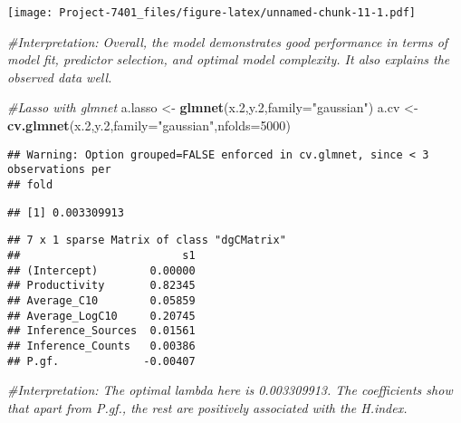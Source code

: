 \documentclass[
]{article}
\newenvironment{Shaded}{\begin{snugshade}}{\end{snugshade}}
\newcommand{\AttributeTok}[1]{\textcolor[rgb]{0.13,0.29,0.53}{#1}}
\newcommand{\CommentTok}[1]{\textcolor[rgb]{0.56,0.35,0.01}{\textit{#1}}}
\newcommand{\DecValTok}[1]{\textcolor[rgb]{0.00,0.00,0.81}{#1}}
\newcommand{\FloatTok}[1]{\textcolor[rgb]{0.00,0.00,0.81}{#1}}
\newcommand{\FunctionTok}[1]{\textcolor[rgb]{0.13,0.29,0.53}{\textbf{#1}}}
\newcommand{\NormalTok}[1]{#1}
\newcommand{\OtherTok}[1]{\textcolor[rgb]{0.56,0.35,0.01}{#1}}
\newcommand{\SpecialCharTok}[1]{\textcolor[rgb]{0.81,0.36,0.00}{\textbf{#1}}}
\newcommand{\StringTok}[1]{\textcolor[rgb]{0.31,0.60,0.02}{#1}}
\begin{document}
\texttt{[image: Project-7401\_files/figure-latex/unnamed-chunk-11-1.pdf]}

\begin{Shaded}
\begin{Highlighting}[]
\CommentTok{\#Interpretation: Overall, the model demonstrates good performance in terms of model fit, predictor selection, and optimal model complexity. It also explains the observed data well.}

\CommentTok{\#Lasso with glmnet}
\NormalTok{a.lasso }\OtherTok{\textless{}{-}} \FunctionTok{glmnet}\NormalTok{(x}\FloatTok{.2}\NormalTok{,y}\FloatTok{.2}\NormalTok{,}\AttributeTok{family=}\StringTok{"gaussian"}\NormalTok{)}
\NormalTok{a.cv }\OtherTok{\textless{}{-}} \FunctionTok{cv.glmnet}\NormalTok{(x}\FloatTok{.2}\NormalTok{,y}\FloatTok{.2}\NormalTok{,}\AttributeTok{family=}\StringTok{"gaussian"}\NormalTok{,}\AttributeTok{nfolds=}\DecValTok{5000}\NormalTok{)}
\end{Highlighting}
\end{Shaded}

\begin{verbatim}
## Warning: Option grouped=FALSE enforced in cv.glmnet, since < 3 observations per
## fold
\end{verbatim}

\begin{Shaded}
\end{Shaded}

\begin{verbatim}
## [1] 0.003309913
\end{verbatim}

\begin{Shaded}
\end{Shaded}

\begin{verbatim}
## 7 x 1 sparse Matrix of class "dgCMatrix"
##                         s1
## (Intercept)        0.00000
## Productivity       0.82345
## Average_C10        0.05859
## Average_LogC10     0.20745
## Inference_Sources  0.01561
## Inference_Counts   0.00386
## P.gf.             -0.00407
\end{verbatim}

\begin{Shaded}
\begin{Highlighting}[]
\CommentTok{\#Interpretation: The optimal lambda here is 0.003309913. The coefficients show that apart from P.gf., the rest are positively associated with the H.index.}
\end{Highlighting}
\end{Shaded}
\end{document}
